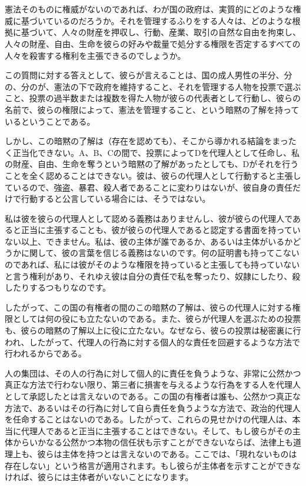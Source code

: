 \documentclass[dvipdfmx, uplatex, tate, landscape]{utbook}
\begin{document}
\chapter{}

憲法そのものに権威がないのであれば、わが国の政府は、実質的にどのような権威に基づいているのだろうか。それを管理するふりをする人々は、どのような根拠に基づいて、人々の財産を押収し、行動、産業、取引の自然な自由を拘束し、人々の財産、自由、生命を彼らの好みや裁量で処分する権限を否定するすべての人々を殺害する権利を主張できるのでしょうか。

この質問に対する答えとして、彼らが言えることは、国の成人男性の半分、分の、分のが、憲法の下で政府を維持すること、それを管理する人物を投票で選ぶこと、投票の過半数または複数を得た人物が彼らの代表者として行動し、彼らの名前で、彼らの権限によって、憲法を管理すること、という暗黙の了解を持っているということである。

しかし、この暗黙の了解は（存在を認めても）、そこから導かれる結論をまったく正当化できない。A、B、Cの間で、投票によってDを代理人として任命し、私の財産、自由、生命を奪うという暗黙の了解があったとしても、Dがそれを行うことを全く認めることはできない。彼は、彼らの代理人として行動すると主張しているので、強盗、暴君、殺人者であることに変わりはないが、彼自身の責任だけで行動すると公言している場合には、そうではない。

私は彼を彼らの代理人として認める義務はありませんし、彼が彼らの代理人であると正当に主張することも、彼が彼らの代理人であると認定する書面を持っていない以上、できません。私は、彼の主体が誰であるか、あるいは主体がいるかどうかに関して、彼の言葉を信じる義務はないのです。何の証明書も持ってこないのであれば、私には彼がそのような権限を持っていると主張しても持っていないと言う権利があり、それゆえ彼は自分の責任で私を奪ったり、奴隷にしたり、殺したりするつもりなのです。

したがって、この国の有権者の間のこの暗黙の了解は、彼らの代理人に対する権限としては何の役にも立たないのである。また、彼らが代理人を選ぶための投票も、彼らの暗黙の了解以上に役に立たない。なぜなら、彼らの投票は秘密裏に行われ、したがって、代理人の行為に対する個人的な責任を回避するような方法で行われるからである。

人の集団は、その人の行為に対して個人的に責任を負うような、非常に公然かつ真正な方法で行わない限り、第三者に損害を与えるような行為をする人を代理人として承認したとは言えないのである。この国の有権者は誰も、公然かつ真正な方法で、あるいはその行為に対して自ら責任を負うような方法で、政治的代理人を任命することはないのである。したがって、これらの見せかけの代理人は、本当に代理人であると正当に主張することはできない。そして、もし彼らがその主体からいかなる公然かつ本物の信任状も示すことができないならば、法律上も道理上も、彼らは主体を持つとは言えないのである。ここでは、「現れないものは存在しない」という格言が適用されます。もし彼らが主体者を示すことができなければ、彼らには主体者がいないことになります。
\end{document}
